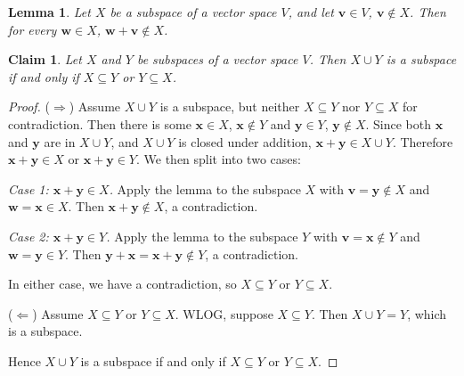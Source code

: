\documentclass{article}
\newtheorem*{claim}{Claim}
\newtheorem*{lemma}{Lemma}
\begin{document}
\begin{lemma}
    Let $X$ be a subspace of a vector space $V$, and let $\mathbf{v} \in V$, $\mathbf{v} \notin X$. Then 
    for every $\mathbf{w} \in X$, $\mathbf{w} + \mathbf{v} \notin X$.
\end{lemma}

\begin{claim}
    Let $X$ and $Y$ be subspaces of a vector space $V$. Then $X \cup Y$ is a subspace if and only if 
    $X \subseteq Y$ or $Y \subseteq X$.
\end{claim}

\begin{proof}
    ($\Longrightarrow$) Assume $X \cup Y$ is a subspace, but neither $X \subseteq Y$ nor $Y \subseteq X$
    for contradiction. Then there is some $\mathbf{x} \in X$, $\mathbf{x} \notin Y$ and 
    $\mathbf{y} \in Y$, $\mathbf{y} \notin X$. Since both $\mathbf{x}$ and $\mathbf{y}$ are in 
    $X \cup Y$, and $X \cup Y$ is closed under addition, $\mathbf{x} + \mathbf{y} \in X \cup Y$. 
    Therefore $\mathbf{x} + \mathbf{y} \in X$ or $\mathbf{x} + \mathbf{y} \in Y$. We then split into two 
    cases:

    \medskip
    \textit{Case 1: $\mathbf{x} + \mathbf{y} \in X$.} Apply the lemma to the subspace $X$ with 
    $\mathbf{v} = \mathbf{y} \notin X$ and $\mathbf{w} = \mathbf{x} \in X$. Then 
    $\mathbf{x} + \mathbf{y} \notin X$, a contradiction.

    \medskip
    \textit{Case 2: $\mathbf{x} + \mathbf{y} \in Y$.} Apply the lemma to the subspace $Y$ with 
    $\mathbf{v} = \mathbf{x} \notin Y$ and $\mathbf{w} = \mathbf{y} \in Y$. Then 
    $\mathbf{y} + \mathbf{x} = \mathbf{x} + \mathbf{y} \notin Y$, a contradiction.

    \medskip

    In either case, we have a contradiction, so  $X \subseteq Y$ or $Y \subseteq X$.

    \medskip

    ($\Longleftarrow$) Assume $X \subseteq Y$ or $Y \subseteq X$. WLOG, suppose $X \subseteq Y$. Then 
    $X \cup Y = Y$, which is a subspace.

    \medskip

    Hence $X \cup Y$ is a subspace if and only if $X \subseteq Y$ or $Y \subseteq X$.
\end{proof}
\end{document}
